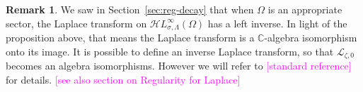 \documentclass{article}
\newcommand{\singexp}[2]{\mathcal{H}L^\infty_{#1, #2}}
\newcommand{\C}{\mathbb{C}}
\newcommand*{\defeq}{\mathrel{\vcenter{\baselineskip0.5ex \lineskiplimit0pt
                     \hbox{\scriptsize.}\hbox{\scriptsize.}}}%
                     =}
\newcommand{\laplace}{\mathcal{L}}
\newcommand{\borel}{\mathcal{B}}
\theoremstyle{definition}
\newtheorem{remark}[definition]{Remark}
\theoremstyle{plain}
\begin{document}
\begin{remark}
We saw in Section~\ref{sec:reg-decay} that when $\Omega$ is an appropriate sector, the Laplace transform on $\singexp{\sigma}{\Lambda}(\Omega)$ has a left inverse. In light of the proposition above, that means the Laplace transform is a $\C$-algebra isomorphism onto its image.
    \color{RoyalBlue} It is possible to define an inverse Laplace transform, so that $\laplace_{\zeta,0}$ becomes an algebra isomorphisms. However we will refer to \textcolor{magenta}{[standard reference]} for details. \textcolor{magenta}{[see also section on Regularity for Laplace]}  
    \color{black}
\end{remark}
\end{document}
